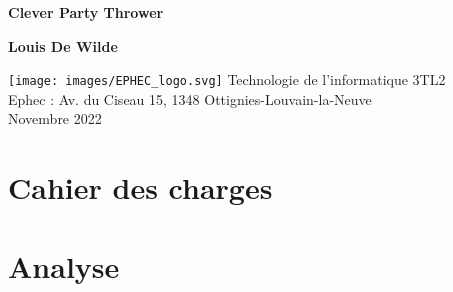 \documentclass[12pt]{article}
\begin{document}
    \begin{titlepage}
        \begin{center}
            \vspace*{1cm}

            \Huge
            \textbf{Clever Party Thrower}

            \vspace{0.5cm}

            \vspace{1.5cm}

            \textbf{Louis De Wilde}

            \vfill

            \texttt{[image: images/EPHEC\_logo.svg]}
            \vfill
            \vspace{0.8cm}
            \Large
            Technologie de l'informatique 3TL2 \\
            Ephec : Av. du Ciseau 15, 1348 Ottignies-Louvain-la-Neuve\\
            Novembre 2022

        \end{center}
    \end{titlepage}
    \thispagestyle{empty}
    \newpage
    \setcounter{page}{0}
    \begin{KeepFromToc}
        \tableofcontents
    \end{KeepFromToc}
    \newpage

    \section{Cahier des charges}\label{sec:cahier-des-charges}
    
    \newpage

    \section{Analyse}\label{sec:analyse}
    
    \newpage
\end{document}
